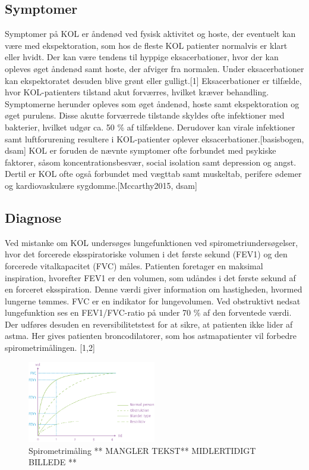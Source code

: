 \subsection{Symptomer}
Symptomer på KOL er åndenød ved fysisk aktivitet og hoste, der eventuelt kan være med ekspektoration, som hos de fleste KOL patienter normalvis er klart eller hvidt. Der kan være tendens til hyppige eksacerbationer, hvor der kan opleves øget åndenød samt hoste, der afviger fra normalen. Under eksacerbationer kan ekspektoratet desuden blive grønt eller gulligt.[1]
Eksacerbationer er tilfælde, hvor KOL-patienters tilstand akut forværres, hvilket kræver behandling. Symptomerne herunder opleves som øget åndenød, hoste samt ekspektoration og øget purulens. Disse akutte forværrede tilstande skyldes ofte infektioner med bakterier, hvilket udgør ca. 50 \% af tilfældene. Derudover kan virale infektioner samt luftforurening resultere i KOL-patienter oplever eksacerbationer.[basisbogen, dsam]
KOL er foruden de nævnte symptomer ofte forbundet med psykiske faktorer, såsom koncentrationsbesvær, social isolation samt depression og angst. Dertil er KOL ofte også forbundet med vægttab samt muskeltab, perifere ødemer og kardiovaskulære sygdomme.[Mccarthy2015, dsam]


\subsection{Diagnose}
Ved mistanke om KOL undersøges lungefunktionen ved spirometriundersøgelser, hvor det forcerede eksspiratoriske volumen i det første sekund (FEV1) og den forcerede vitalkapacitet (FVC) måles. Patienten foretager en maksimal inspiration, hvorefter FEV1 er den volumen, som udåndes i det første sekund af en forceret eksspiration. Denne værdi giver information om hastigheden, hvormed lungerne tømmes. FVC er en indikator for lungevolumen. Ved obstruktivt nedsat lungefunktion ses en FEV1/FVC-ratio på under 70 \% af den forventede værdi. Der udføres desuden en reversibilitetstest for at sikre, at patienten ikke lider af astma. Her gives patienten broncodilatorer, som hos astmapatienter vil forbedre spirometrimålingen. [1,2]

\begin{figure} [H]
\centering
\includegraphics[width=0.5\textwidth]{figures/FEV}
\caption{Spirometrimåling ** MANGLER TEKST** MIDLERTIDIGT BILLEDE **}
\label{fig:FEV}
\end{figure} 

